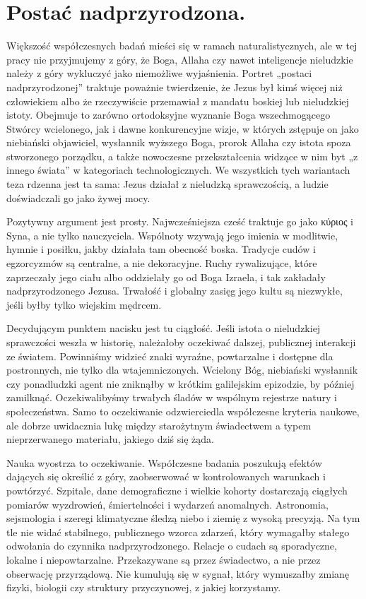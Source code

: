 \section{Postać nadprzyrodzona.}\label{sec:supernatural}

Większość współczesnych badań mieści się w ramach naturalistycznych, ale w tej pracy nie przyjmujemy z góry, że Boga, Allaha czy nawet inteligencje nieludzkie należy z góry wykluczyć jako niemożliwe wyjaśnienia.
Portret „postaci nadprzyrodzonej” traktuje poważnie twierdzenie, że Jezus był kimś więcej niż człowiekiem albo że rzeczywiście przemawiał z mandatu boskiej lub nieludzkiej istoty.
Obejmuje to zarówno ortodoksyjne wyznanie Boga wszechmogącego Stwórcy wcielonego, jak i dawne konkurencyjne wizje, w których zstępuje on jako niebiański objawiciel, wysłannik wyższego Boga, prorok Allaha czy istota spoza stworzonego porządku, a także nowoczesne przekształcenia widzące w nim byt „z innego świata” w kategoriach technologicznych.
We wszystkich tych wariantach teza rdzenna jest ta sama: Jezus działał z nieludzką sprawczością, a ludzie doświadczali go jako żywej mocy.

Pozytywny argument jest prosty.
Najwcześniejsza cześć traktuje go jako κύριος i Syna, a nie tylko nauczyciela.
Wspólnoty wzywają jego imienia w modlitwie, hymnie i posiłku, jakby działała tam obecność boska.
Tradycje cudów i egzorcyzmów są centralne, a nie dekoracyjne.
Ruchy rywalizujące, które zaprzeczały jego ciału albo oddzielały go od Boga Izraela, i tak zakładały nadprzyrodzonego Jezusa.
Trwałość i globalny zasięg jego kultu są niezwykłe, jeśli byłby tylko wiejskim mędrcem.

Decydującym punktem nacisku jest tu ciągłość.
Jeśli istota o nieludzkiej sprawczości weszła w historię, należałoby oczekiwać dalszej, publicznej interakcji ze światem.
Powinniśmy widzieć znaki wyraźne, powtarzalne i dostępne dla postronnych, nie tylko dla wtajemniczonych.
Wcielony Bóg, niebiański wysłannik czy ponadludzki agent nie zniknąłby w krótkim galilejskim epizodzie, by później zamilknąć.
Oczekiwalibyśmy trwałych śladów w wspólnym rejestrze natury i społeczeństwa.
Samo to oczekiwanie odzwierciedla współczesne kryteria naukowe, ale dobrze uwidacznia lukę między starożytnym świadectwem a typem nieprzerwanego materiału, jakiego dziś się żąda.

Nauka wyostrza to oczekiwanie.
Współczesne badania poszukują efektów dających się określić z góry, zaobserwować w kontrolowanych warunkach i powtórzyć.
Szpitale, dane demograficzne i wielkie kohorty dostarczają ciągłych pomiarów wyzdrowień, śmiertelności i wydarzeń anomalnych.
Astronomia, sejsmologia i szeregi klimatyczne śledzą niebo i ziemię z wysoką precyzją.
Na tym tle nie widać stabilnego, publicznego wzorca zdarzeń, który wymagałby stałego odwołania do czynnika nadprzyrodzonego.
Relacje o cudach są sporadyczne, lokalne i niepowtarzalne.
Przekazywane są przez świadectwo, a nie przez obserwację przyrządową.
Nie kumulują się w sygnał, który wymuszałby zmianę fizyki, biologii czy struktury przyczynowej, z jakiej korzystamy.


